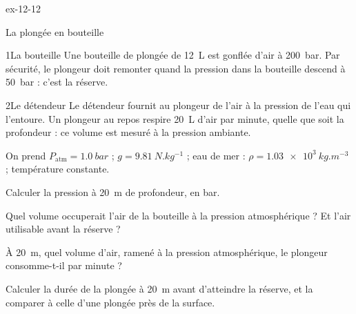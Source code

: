 \begin{blocLivre}{ex-12-12}
\begin{exercice}[3]{La plongée en bouteille}
\begin{docu}{1}{La bouteille}
Une bouteille de plongée de \qty{12}{L} est gonflée d'air à \qty{200}{bar}. Par sécurité, le plongeur doit remonter quand la pression
dans la bouteille descend à \qty{50}{bar} : c'est la réserve.
\end{docu}
\begin{docu}{2}{Le détendeur}
Le détendeur fournit au plongeur de l'air à la pression de l'eau qui l'entoure. Un plongeur au repos respire \qty{20}{L} d'air par
minute, quelle que soit la profondeur : ce volume est mesuré à la pression ambiante.
\end{docu}
\begin{donnees}
On prend $P_\mathrm{atm}=\qty{1,0}{bar}$ ; $g=\qty{9,81}{N.kg^{-1}}$ ; eau de mer : $\rho=\qty{1,03e3}{kg.m^{-3}}$ ; température constante.
\end{donnees}
\begin{questions}
\item Calculer la pression à \qty{20}{m} de profondeur, en bar.
\item Quel volume occuperait l'air de la bouteille à la pression atmosphérique ? Et l'air utilisable avant la réserve ?
\item À \qty{20}{m}, quel volume d'air, ramené à la pression atmosphérique, le plongeur consomme-t-il par minute ?
\item \initiative Calculer la durée de la plongée à \qty{20}{m} avant d'atteindre la réserve, et la comparer à celle d'une plongée près de la
surface.
\end{questions}
\end{exercice}
\end{blocLivre}

